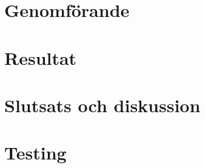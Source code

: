 \section{Genomförande}

\clearpage
\section{Resultat}

\clearpage
\section{Slutsats och diskussion}


\bilagor
\section{Testing}


\preenddocument

